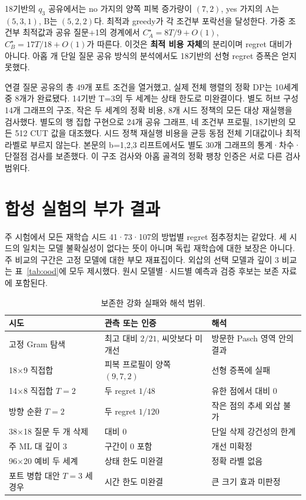 \documentclass[11pt,a4paper]{article}
\theoremstyle{definition}
\theoremstyle{remark}\newtheorem{remark}[theorem]{주석}
\newcommand{\Opt}{C^{\star}}
\begin{document}
18기반의 $q_3$ 공유에서는 no 가지의 양쪽 피복 증가량이 $(7,2)$, yes 가지의 A는 $(5,3,1)$, B는 $(5,2,2)$다. 최적과 greedy가 각 조건부 포락선을 달성한다. 가중 조건부 최적값과 공유 질문+1의 경계에서 $\Opt_A=8T/9+O(1)$, $\Opt_B=17T/18+O(1)$가 따른다. 이것은 \textbf{최적 비용 자체}의 분리이며 regret 대비가 아니다. 아홉 개 단일 질문 공유 방식의 분석에서도 18기반의 선형 regret 증폭은 얻지 못했다.

연결 질문 공유의 총 49개 포트 조건을 열거했고, 실제 전체 행렬의 정확 DP는 10세계 중 8개가 완료됐다. 14기반 T=3의 두 세계는 상태 한도로 미완결이다. 별도 허브 구성 14개 그래프의 구조, 작은 두 세계의 정확 비용, 8개 시드 정책의 모든 대상 재실행을 검사했다. 별도의 행 집합 구현으로 24개 공유 그래프, 네 조건부 프로필, 18기반의 모든 512 CUT 값을 대조했다. 시드 정책 재실행 비용을 균등 동점 전체 기대값이나 최적 라벨로 부르지 않는다. 본문의 b=1,2,3 리프트에서도 별도 30개 그래프의 통계·차수·단절점 검사를 보존했다. 이 구조 검사와 아홉 골격의 정확 팽창 인증은 서로 다른 검사 범위다.

\section{합성 실험의 부가 결과}\label{app:empirical}
주 시험에서 모든 재학습 시드 41·73·107의 방법별 regret 점추정치는 같았다. 세 시드의 일치는 모델 불확실성이 없다는 뜻이 아니며 독립 재학습에 대한 보장은 아니다. 주 비교의 구간은 고정 모델에 대한 부모 재표집이다. 외삽의 선택 모델과 깊이 3 비교는 표~\ref{tab:ood}에 모두 제시했다. 원시 모델별·시드별 예측과 검증 후보는 보존 자료에 포함된다.

\begin{table}[htbp]\centering\small
\caption{보존한 강화 실패와 해석 범위.}\label{tab:nulls}
\begin{tabularx}{\linewidth}{lYY}\toprule
시도&관측 또는 인증&해석\\\midrule
고정 Gram 탐색&최고 대비 $2/21$, 씨앗보다 미개선&방문한 Pasch 영역 안의 결과\\
18×9 직접합&피복 프로필이 양쪽 $(9,7,2)$&선형 증폭에 실패\\
14×8 직접합 $T=2$&두 regret $1/48$&유한 점에서 대비 0\\
방향 순환 $T=2$&두 regret $1/120$&작은 점의 추세 외삽 불가\\
38×18 질문 두 개 삭제&대비 0&단일 삭제 강건성의 한계\\
주 ML 대 깊이 3&구간이 0 포함&개선 미확정\\
96×20 예비 두 세계&상태 한도 미완결&정확 라벨 없음\\
포트 병합 대안 $T=3$ 세 경우&시간 한도 미완결&큰 크기 효과 미판정\\\bottomrule
\end{tabularx}
\end{table}
\end{document}

